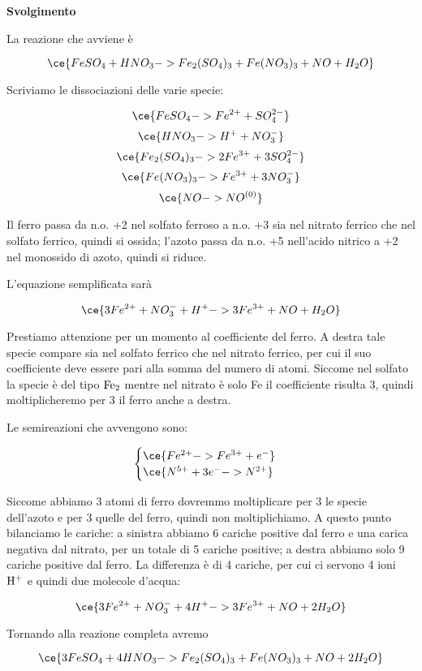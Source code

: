 \vspace{0.2cm}\large\textbf{Svolgimento}\normalsize

\vspace{0.2cm}La reazione che avviene è

$$\ce{FeSO_4 + HNO_3 -> Fe_2(SO_4)_3 + Fe(NO_3)_3 + NO + H_2O}$$

Scriviamo le dissociazioni delle varie specie:

$$\ce{FeSO_4 -> Fe^{2+} + SO_4^{2-}}$$
$$\ce{HNO_3 -> H^+ + NO_3^-}$$
$$\ce{Fe_2(SO_4)_3 -> 2Fe^{3+} + 3SO_4^{2-}}$$
$$\ce{Fe(NO_3)_3 -> Fe^{3+} + 3NO_3^-}$$
$$\ce{NO -> NO^{(0)}}$$

Il ferro passa da n.o. +2 nel solfato ferroso a n.o. +3 sia nel nitrato ferrico che nel solfato ferrico, quindi si ossida; l'azoto passa da n.o. +5 nell'acido nitrico a +2 nel monossido di azoto, quindi si riduce.

L'equazione semplificata sarà

$$\ce{3Fe^{2+} + NO_3^- + H^+ -> 3Fe^{3+} + NO + H_2O}$$

Prestiamo attenzione per un momento al coefficiente del ferro. A destra tale specie compare sia nel solfato ferrico che nel nitrato ferrico, per cui il suo coefficiente deve essere pari alla somma del numero di atomi. Siccome nel solfato la specie è del tipo $\rm Fe_2$ mentre nel nitrato è solo Fe il coefficiente risulta 3, quindi moltiplicheremo per 3 il ferro anche a destra.

Le semireazioni che avvengono sono:

$$\begin{cases}
    \ce{Fe^{2+} -> Fe^{3+} + e^-}\\
    \ce{N^{5+} +3e^- -> N^{2+}}
\end{cases}$$

Siccome abbiamo 3 atomi di ferro dovremmo moltiplicare per 3 le specie dell'azoto e per 3 quelle del ferro, quindi non moltiplichiamo. A questo punto bilanciamo le cariche: a sinistra abbiamo 6 cariche positive dal ferro e una carica negativa dal nitrato, per un totale di 5 cariche positive; a destra abbiamo solo 9 cariche positive dal ferro. La differenza è di 4 cariche, per cui ci servono 4 ioni $\rm H^+$ e quindi due molecole d'acqua:

$$\ce{3Fe^{2+} + NO_3^- + 4H^+ -> 3Fe^{3+} + NO + 2H_2O}$$

Tornando alla reazione completa avremo

$$\ce{3FeSO_4 + 4HNO_3 -> Fe_2(SO_4)_3 + Fe(NO_3)_3 + NO + 2H_2O}$$

